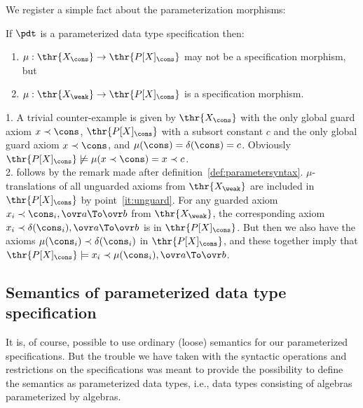 We register a simple fact about the parameterization morphisms:
\begin{fact}\label{fa:weakparamor}
If $\pdt$ %
is a parameterized data type
specification then:
\begin{enumerate}\MyLPar
\item $\mu: \thr{X_\cons} \to \thr{P[X]_\cons}$ may not be a specification morphism, but
\item $\mu: \thr{X_\weak} \to \thr{P[X]_\cons}$ is a specification morphism.
\end{enumerate}
\end{fact}
\begin{PROOF}
1. A trivial counter-example is given by $\thr{X_\cons}$ with the only global
   guard axiom $x\prec\cons$, $\thr{P[X]_\cons}$ with a subsort constant $c$ and
   the only global guard   axiom $x\prec\cons$, and
   $\mu(\cons)=\delta(\cons)=c$. Obviously $\thr{P[X]_\cons}\not\models
   \mu(x\prec\cons)= x\prec c$.
\\[1ex]
2. follows by the remark made after
definition~\ref{def:parametersyntax}. $\mu$-translations of all unguarded
axioms from $\thr{X_\weak}$ are included in $\thr{P[X]_\cons}$ by
point~\ref{it:unguard}. For any guarded axiom $x_i\prec\cons_i,\ovr a\To\ovr
b$ from $\thr{X_\weak}$, the corresponding axiom
$x_i\prec\delta(\cons_i),\ovr a\To\ovr b$ is in $\thr{P[X]_\cons}$. But then
we also have the axioms $\mu(\cons_i)\prec\delta(\cons_i)$ in
$\thr{P[X]_\cons}$, and these together imply that $\thr{P[X]_\cons}\models
x_i\prec\mu(\cons_i),\ovr a\To\ovr b$.
\end{PROOF}
%

\subsection{Semantics of parameterized data type specification}
It is, of course, possible to use ordinary (loose) semantics for our
parameterized specifications. But the trouble we have taken with the
syntactic operations and restrictions on the specifications was meant to
provide the possibility to define the semantics as 
parameterized data types, i.e., data types consisting of algebras parameterized
by algebras.

